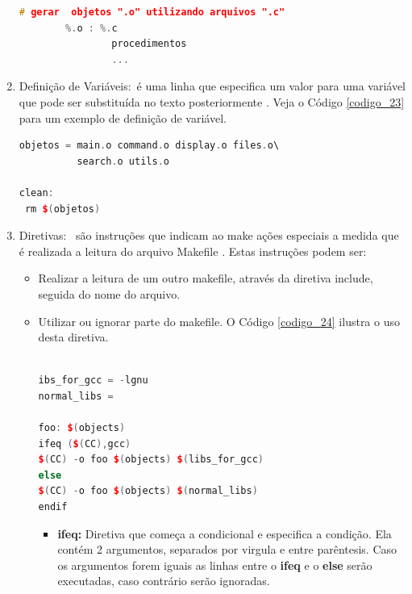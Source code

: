 \begin{enumerate}
\begin{lstlisting}[language=C++,frame=single,title={Código 22: 
                      Exemplo de utilização de padrões no makefile},
                                                    label=codigo_22]
        # gerar  objetos ".o" utilizando arquivos ".c"
        %.o : %.c
                procedimentos
                ...

    \end{lstlisting}


    \item Definição de Variáveis:\
 é uma linha que especifica um valor para uma variável que pode ser substituída no
 texto posteriormente \cite{ref43}. Veja o Código \ref{codigo_23} para um exemplo de 
definição de variável.

    \begin{lstlisting}[language=C++,frame=single,title={Código 23: 
                              Definição de variavel e utilização},
                                                    label=codigo_23]
objetos = main.o command.o display.o files.o\
          search.o utils.o

clean:
 rm $(objetos)
    \end{lstlisting}


    \item Diretivas: \
são instruções que indicam ao make ações especiais a medida que é realizada a leitura do
 arquivo Makefile \cite{ref43}. Estas instruções podem ser:

    \begin{itemize}
        \item Realizar a leitura de um outro makefile, através da diretiva include, seguida do nome do arquivo.
        \item Utilizar ou ignorar parte do makefile.\cite{ref43} O Código \ref{codigo_24} ilustra o uso desta diretiva. 


    \begin{lstlisting}[language=C++,frame=single,title={Código 24: 
                        Exemplo Make file com diretiva condicional},
                                                    label=codigo_24]

ibs_for_gcc = -lgnu
normal_libs =

foo: $(objects)
ifeq ($(CC),gcc)
$(CC) -o foo $(objects) $(libs_for_gcc)
else
$(CC) -o foo $(objects) $(normal_libs)
endif


    \end{lstlisting}

    \begin{itemize}
        \item \textbf{ifeq:} Diretiva que começa a condicional e especifica a 
    condição. Ela contém 2 argumentos, separados por virgula e entre parêntesis.
     Caso os argumentos forem iguais as linhas entre o \textbf{ifeq} e o
     \textbf{else} serão executadas, caso contrário serão ignoradas\cite{ref50}.


\end{itemize}
\end{itemize}
\end{enumerate}
